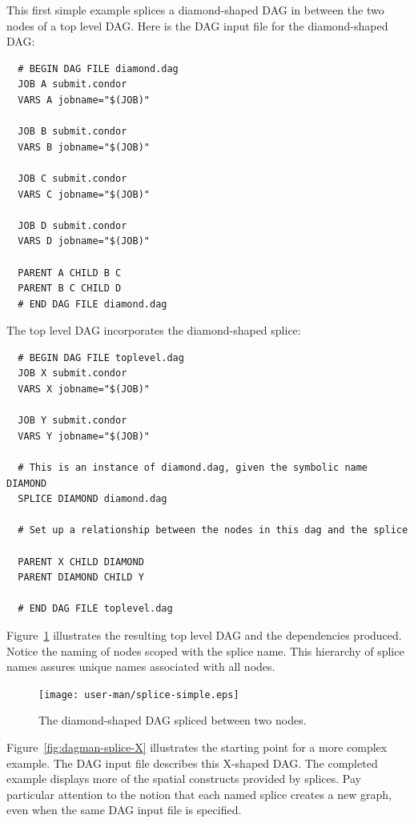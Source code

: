 This first simple example splices a diamond-shaped DAG in
between the two nodes of a top level DAG.
Here is the DAG input file for the diamond-shaped DAG:

\begin{verbatim}
  # BEGIN DAG FILE diamond.dag
  JOB A submit.condor
  VARS A jobname="$(JOB)"

  JOB B submit.condor
  VARS B jobname="$(JOB)"

  JOB C submit.condor
  VARS C jobname="$(JOB)"

  JOB D submit.condor
  VARS D jobname="$(JOB)"

  PARENT A CHILD B C
  PARENT B C CHILD D
  # END DAG FILE diamond.dag
\end{verbatim}

The top level DAG incorporates the diamond-shaped splice:

\begin{verbatim}
  # BEGIN DAG FILE toplevel.dag
  JOB X submit.condor
  VARS X jobname="$(JOB)"

  JOB Y submit.condor
  VARS Y jobname="$(JOB)"

  # This is an instance of diamond.dag, given the symbolic name DIAMOND
  SPLICE DIAMOND diamond.dag

  # Set up a relationship between the nodes in this dag and the splice

  PARENT X CHILD DIAMOND
  PARENT DIAMOND CHILD Y

  # END DAG FILE toplevel.dag
\end{verbatim}

Figure~\ref{fig:dagman-splice-simple} illustrates the resulting
top level DAG and the dependencies produced. 
Notice the naming of nodes
scoped with the splice name.
This hierarchy of splice names assures unique names associated with all nodes.

\begin{figure}
\centering
\texttt{[image: user-man/splice-simple.eps]}
\caption{\label{fig:dagman-splice-simple} The diamond-shaped DAG spliced between two nodes.}
\end{figure}

Figure~\ref{fig:dagman-splice-X} illustrates the starting point
for a more complex example.
The DAG input file  describes this X-shaped DAG.
The completed example displays more of
the spatial constructs provided by splices.
Pay particular attention to the notion that each named splice creates a
new graph, even when the same DAG input file is specified.


